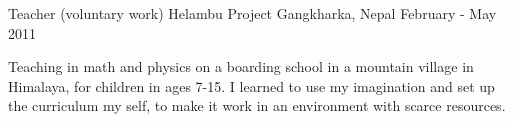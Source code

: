 \begin{cventries}
\cventry
{Teacher (voluntary work)} %
{Helambu Project} %
{Gangkharka, Nepal} %
{February - May 2011} %
{ %
\begin{cvitems}
\item {Teaching in math and physics on a boarding school in a mountain village in Himalaya, for children in ages 7-15. 
		I learned to use my imagination and set up the curriculum my self, to make it work in an environment with scarce resources.
}
\end{cvitems}
}

\end{cventries}